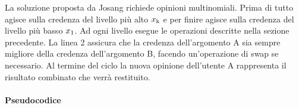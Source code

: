 \documentclass{report}
\newcommand{\myparagraph}[1]{\paragraph{#1}\mbox{} \mbox{}}
\begin{document}
	La soluzione proposta da Josang richiede opinioni multinomiali. Prima di
	tutto agisce sulla credenza del livello più alto $x\textsubscript{k}$ e per finire agisce
	sulla credenza del livello più basso $x\textsubscript{1}$. Ad ogni livello esegue le
	operazioni descritte nella sezione precedente. La linea 2 assicura che
	la credenza dell'argomento A sia sempre migliore della credenza
	dell'argomento B, facendo un'operazione di swap se necessario. Al
	termine del ciclo la nuova opinione dell'utente A rappresenta il
	risultato combinato che verrà restituito.
	
	\hypertarget{header-n156}{%
		\myparagraph{Pseudocodice}\label{header-n156}}
	
	\begin{center}
\end{center}
\end{document}
